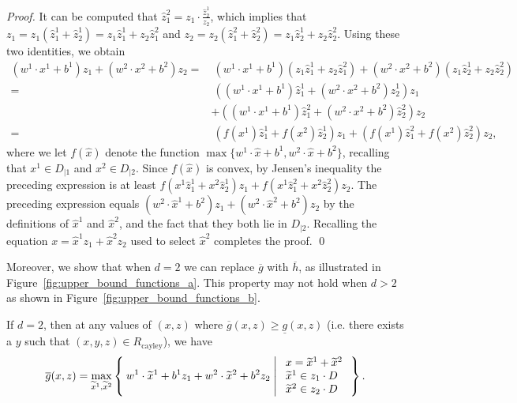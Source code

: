 \documentclass[smallextended]{svjour3}
\newcommand{\tx}{\widetilde{x}}
\newcommand{\Rcayley}{R_{\operatorname{cayley}}}
\newcommand{\ubar}[1]{\underline{#1}}
\renewcommand{\bar}[1]{\overline{#1}}
\begin{document}
\begin{proof}
It can be computed that $\hat{z}^2_1 = z_1\cdot\frac{\hat{z}^1_2}{z_2}$, which implies that $z_1=z_1(\hat{z}^1_1+\hat{z}^1_2)=z_1\hat{z}^1_1+z_2\hat{z}^2_1$ and $z_2=z_2(\hat{z}^2_1+\hat{z}^2_2)=z_1\hat{z}^1_2+z_2\hat{z}^2_2$. Using these two identities, we obtain
\begin{align*}
(w^1\cdot x^1+b^1)z_1+(w^2\cdot x^2+b^2)z_2 
= &\ (w^1\cdot x^1+b^1)(z_1\hat{z}^1_1+z_2\hat{z}^2_1)+(w^2\cdot x^2+b^2)(z_1\hat{z}^1_2+z_2\hat{z}^2_2) \\
= &\ ((w^1\cdot x^1+b^1)\hat{z}^1_1+(w^2\cdot x^2+b^2)\hat{z}^1_2)z_1 \\
& + ((w^1\cdot x^1+b^1)\hat{z}^2_1+(w^2\cdot x^2+b^2)\hat{z}^2_2)z_2 \\
= &\ (f(x^1)\hat{z}^1_1+f(x^2)\hat{z}^1_2)z_1+(f(x^1)\hat{z}^2_1+f(x^2)\hat{z}^2_2)z_2,
\end{align*}
where we let $f(\hat{x})$ denote the function $\max\{w^1\cdot\hat{x}+b^1,w^2\cdot\hat{x}+b^2\}$, recalling that $x^1\in D_{|1}$ and $x^2\in D_{|2}$.  Since $f(\hat{x})$ is convex, by Jensen's inequality the preceding expression is at least
$f(x^1\hat{z}^1_1+x^2\hat{z}^1_2)z_1+f(x^1\hat{z}^2_1+x^2\hat{z}^2_2)z_2$. The preceding expression equals $(w^2\cdot\hat{x}^1+b^2)z_1+(w^2\cdot\hat{x}^2+b^2)z_2$ by the definitions of $\hat{x}^1$ and $\hat{x}^2$, and the fact that they both lie in $D_{|2}$. Recalling the equation $x=\hat{x}^1z_1+\hat{x}^2z_2$ used to select $\hat{x}^2$ completes the proof.
\qed\end{proof}


Moreover, we show that when $d=2$ we can replace $\bar{g}$ with $\bar{h}$, as illustrated in Figure~\ref{fig:upper_bound_functions_a}. This property may not hold when $d > 2$ as shown in Figure~\ref{fig:upper_bound_functions_b}.

\begin{lemma}\label{lem:max_2_ideal_ub}
    If $d = 2$, then at any values of $(x,z)$ where $\bar{g}(x,z)\ge\ubar{g}(x,z)$ (i.e. there exists a $y$ such that $(x,y,z) \in \Rcayley$), we have
\begin{align}\label{eqn:max_2_ideal_ub}
\bar{g}(x,z) = \max_{\tx^1, \tx^2}\Set{w^1 \cdot \tx^1 + b^1 z_1 + w^2 \cdot \tx^2 + b^2 z_2 | \begin{array}{l} x = \tx^1 + \tx^2 \\ \tx^1 \in z_1 \cdot D \\ \tx^2 \in z_2 \cdot D \end{array}}.
\end{align}
\end{lemma}
\end{document}
